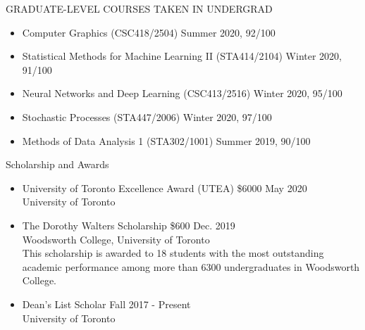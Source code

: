 \documentclass{resume} %
\newcommand{\tab}[1]{\hspace{.2667\textwidth}\rlap{#1}}
\newcommand{\itab}[1]{\hspace{0em}\rlap{#1}}
\begin{document}
\begin{rSection}{GRADUATE-LEVEL COURSES TAKEN IN UNDERGRAD}
\begin{itemize}
	\item Computer Graphics (CSC418/2504) \hfill{Summer 2020, 92/100}
	\item Statistical Methods for Machine Learning II (STA414/2104) \hfill{Winter 2020, 91/100}
	\item Neural Networks and Deep Learning (CSC413/2516) \hfill{Winter 2020, 95/100}
	\item Stochastic Processes (STA447/2006) \hfill{Winter 2020, 97/100}
	\item Methods of Data Analysis 1 (STA302/1001) \hfill{Summer 2019, 90/100}
\end{itemize}
\end{rSection}

\begin{rSection}{Scholarship and Awards}
\begin{itemize}
	\item University of Toronto Excellence Award (UTEA) \$6000 \hfill{May 2020}\\
	University of Toronto
	\item The Dorothy Walters Scholarship \$600 \hfill{Dec. 2019}\\
	Woodsworth College, University of Toronto\\
	This scholarship is awarded to 18 students with the most outstanding academic performance among more than 6300 undergraduates in Woodsworth College.
	\item Dean's List Scholar \hfill{Fall 2017 - Present}\\
	University of Toronto
\end{itemize}
\end{rSection}
\end{document}
